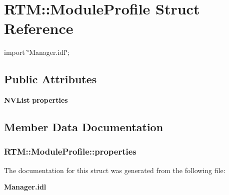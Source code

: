 \section{RTM::ModuleProfile Struct Reference}
\label{structRTM_1_1ModuleProfile}


{\ttfamily import \char`\"{}Manager.idl\char`\"{};}

\subsection*{Public Attributes}
\begin{DoxyCompactItemize}
\item 
{\bf NVList} {\bf properties}
\end{DoxyCompactItemize}


\subsection{Member Data Documentation}
\subsubsection[{properties}]{ {\bf RTM::ModuleProfile::properties}}\label{structRTM_1_1ModuleProfile_a50998e1c3e346b22e480cff93ff73eb1}


The documentation for this struct was generated from the following file:\begin{DoxyCompactItemize}
\item 
{\bf Manager.idl}\end{DoxyCompactItemize}
